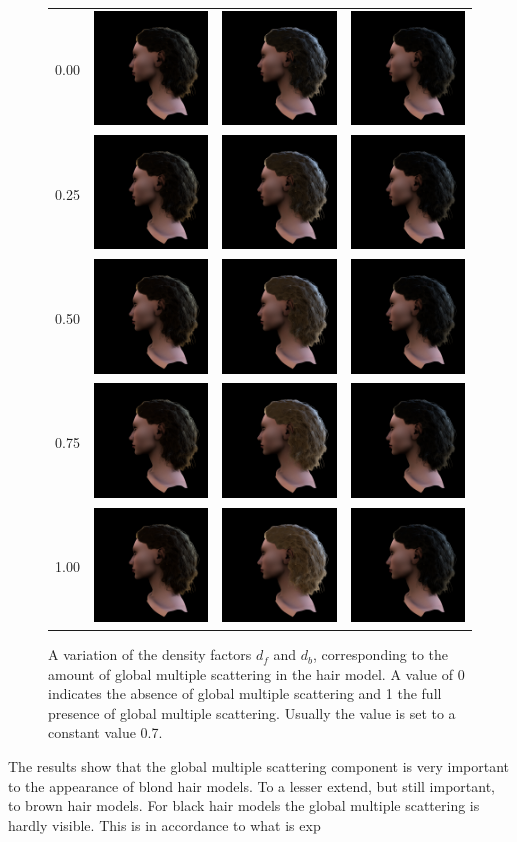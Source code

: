 \documentclass[11pt,a4paper]{report}
\begin{document}
\begin{figure}[h]
\begin{tabular}{cccc}
0.00 & \includegraphics[scale=0.12]{dbdf-results/brown_dbdf_0_00.png} & \includegraphics[scale=0.12]{dbdf-results/blonde_dbdf_0_00.png} & \includegraphics[scale=0.12]{dbdf-results/black_dbdf_0_00.png} \\
0.25 & \includegraphics[scale=0.12]{dbdf-results/brown_dbdf_0_25.png} & \includegraphics[scale=0.12]{dbdf-results/blonde_dbdf_0_25.png} & \includegraphics[scale=0.12]{dbdf-results/black_dbdf_0_25.png} \\
0.50 & \includegraphics[scale=0.12]{dbdf-results/brown_dbdf_0_50.png} & \includegraphics[scale=0.12]{dbdf-results/blonde_dbdf_0_50.png} & \includegraphics[scale=0.12]{dbdf-results/black_dbdf_0_50.png} \\
0.75 & \includegraphics[scale=0.12]{dbdf-results/brown_dbdf_0_75.png} & \includegraphics[scale=0.12]{dbdf-results/blonde_dbdf_0_75.png} & \includegraphics[scale=0.12]{dbdf-results/black_dbdf_0_75.png} \\
1.00 & \includegraphics[scale=0.12]{dbdf-results/brown_dbdf_1_00.png} & \includegraphics[scale=0.12]{dbdf-results/blonde_dbdf_1_00.png} & \includegraphics[scale=0.12]{dbdf-results/black_dbdf_1_00.png} \\
\end{tabular}
\egroup
\caption{A variation of the density factors $d_f$ and $d_b$, corresponding to the amount of global multiple scattering in the hair model. A value of 0 indicates the absence of global multiple scattering and 1 the full presence of global multiple scattering. Usually the value is set to a constant value 0.7.}
\label{fig_results_df}
\end{figure}

The results show that the global multiple scattering component is very important to the appearance of blond hair models. To a lesser extend, but still important, to brown hair models. For black hair models the global multiple scattering is hardly visible. This is in accordance to what is exp
\end{document}
